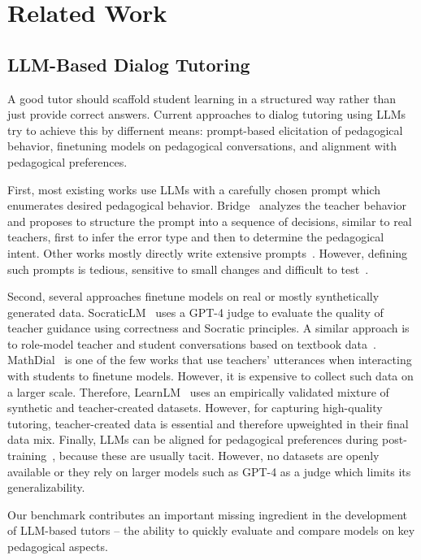 \section{Related Work}
\subsection{LLM-Based Dialog Tutoring}
A good tutor should scaffold student learning in a structured way rather than just provide correct answers. 
Current approaches to dialog tutoring using LLMs try to achieve this by differnent means: prompt-based elicitation of pedagogical behavior, finetuning models on pedagogical conversations, and alignment with pedagogical preferences. 

First, most existing works use LLMs with a carefully chosen prompt which enumerates desired pedagogical behavior. Bridge~\cite{bridge24} analyzes the teacher behavior and proposes to structure the prompt into a sequence of decisions, similar to real teachers, first to infer the error type and then to determine the pedagogical intent. Other works mostly directly write extensive prompts~\cite{class2023,kargupta-etal-2024-instruct}. However, defining such prompts is tedious, sensitive to small changes and difficult to test~\cite{jurenka2024towards}.

Second, several approaches finetune models on real or mostly synthetically generated data.
SocraticLM~\cite{socraticlm2024} uses a GPT-4 judge to evaluate the quality of teacher guidance using correctness and Socratic principles. A similar approach is to role-model teacher and student conversations based on textbook data~\cite{tutorchat24,book2dial2024}. MathDial~\cite{mathdial2023} is one of the few works that use teachers' utterances when interacting with students to finetune models. However, it is expensive to collect such data on a larger scale. Therefore, LearnLM~\cite{team2024learnlm}
uses an empirically validated mixture of synthetic and teacher-created datasets. However, for capturing high-quality tutoring, teacher-created data is essential and therefore upweighted in their final data mix.
Finally, LLMs can be aligned for pedagogical preferences during post-training~\cite{team2024learnlm}, because these are usually tacit. However, no datasets are openly available or they rely on larger models such as GPT-4 as a judge which limits its generalizability.

Our benchmark contributes an important missing ingredient in the development of LLM-based tutors -- the ability to quickly evaluate and compare models on key pedagogical aspects. 



